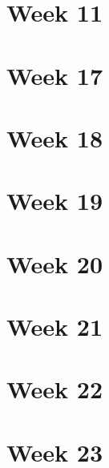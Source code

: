 \documentclass{article}
\begin{document}
\section{Week 11}

\section{Week 17}

\section{Week 18}

\section{Week 19}

\section{Week 20}

\section{Week 21}

\section{Week 22}

\section{Week 23}
\end{document}
